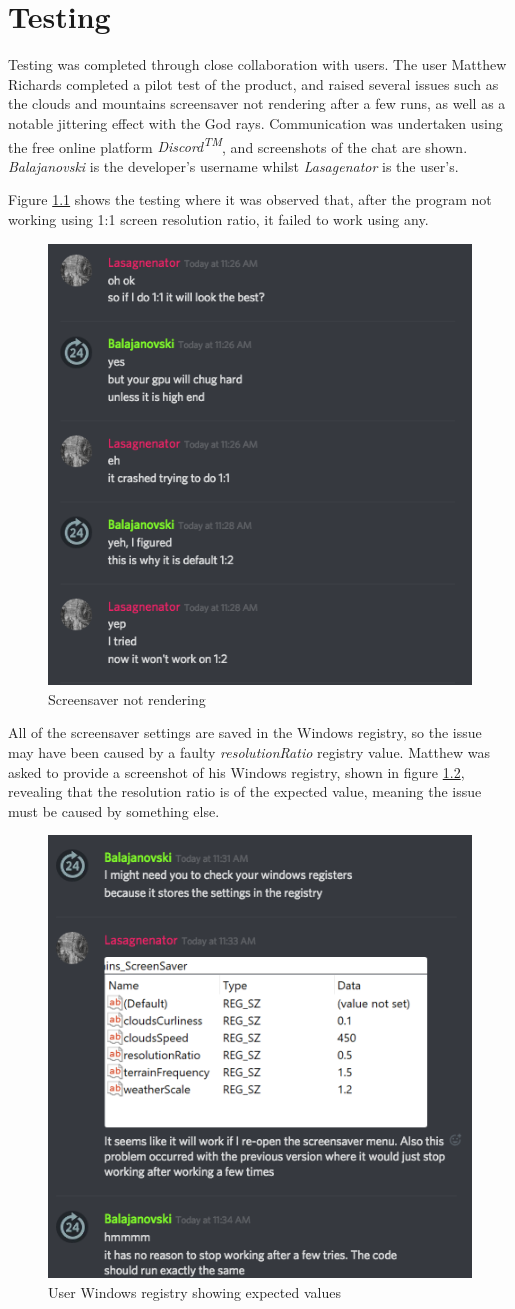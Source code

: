 \documentclass[10pt, openany]{book}
\begin{document}
\chapter{Testing}

Testing was completed through close collaboration with users. The user Matthew Richards completed a pilot test of the product, and raised several issues such as the clouds and mountains screensaver not rendering after a few runs, as well as a notable jittering effect with the God rays. Communication was undertaken using the free online platform \textit{Discord\textsuperscript{TM}}, and screenshots of the chat are shown. \textit{Balajanovski} is the developer's username whilst \textit{Lasagenator} is the user's.

Figure \ref{fig:not-working} shows the testing where it was observed that, after the program not working using 1:1 screen resolution ratio, it failed to work using any.

\begin{figure}[H]
	\centering
	\includegraphics[width=0.5\linewidth]{testing1}
	\caption{Screensaver not rendering}
	\label{fig:not-working}
\end{figure}

All of the screensaver settings are saved in the Windows registry, so the issue may have been caused by a faulty \textit{resolutionRatio} registry value. Matthew was asked to provide a screenshot of his Windows registry, shown in figure \ref{fig:registry}, revealing that the resolution ratio is of the expected value, meaning the issue must be caused by something else.

\begin{figure}[H]
	\centering
	\includegraphics[width=0.5\linewidth]{testing2}
	\caption{User Windows registry showing expected values}
	\label{fig:registry}
\end{figure}
\end{document}
